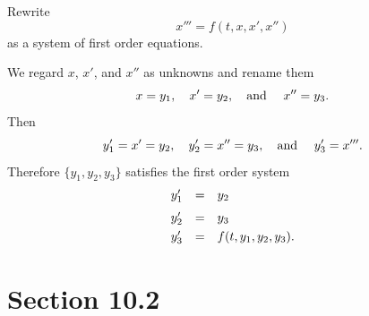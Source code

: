 \setcounter{example}{6}
\begin{example}
  \label{example:10.1.7} \rm Rewrite
  \[
    x'''=f(t,x,x',x'')
  \]
  as a system of first order equations.
\end{example}
\begin{examplesolution}
\solution We regard $x$, $x'$, and $x''$ as unknowns and rename them
\[
  x=y_{1},\quad x'=y_{2},\mbox{\quad and \quad}x''=y_{3}.
\]
Then
\[
  y_{1}'=x'=y_{2},\quad y_{2}'=x''=y_{3},\mbox{\quad and \quad}y_{3}'=x'''.
\]
Therefore $\{y_{1},y_{2},y_{3}\}$ satisfies the first order system
\[
  \begin{array}{ccl}
    y_{1}' & = & y_{2}                   \\[2\jot]
    y_{2}' & = & y_{3}                   \\[1\jot]
    y_{3}' & = & f(t,y_{1},y_{2},y_{3}).
  \end{array}
\]
\end{examplesolution}

\section*{Section 10.2}
\setcounter{chapter}{10}
\setcounter{section}{2}

